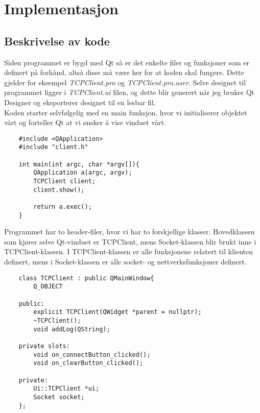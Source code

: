 \section{Implementasjon}
\subsection{Beskrivelse av kode}
Siden programmet er bygd med Qt så er det enkelte filer og funksjoner som er definert på forhånd, altså disse må være her for at koden skal fungere. Dette gjelder for eksempel \textit{TCPClient.pro} og \textit{TCPClient.pro.user}. Selve designet til programmet ligger i \textit{TCPClient.ui} filen, og dette blir generert når jeg bruker Qt Designer og eksporterer designet til en lesbar fil.\\

Koden starter selvfølgelig med en main funksjon, hvor vi initialiserer objektet vårt og forteller Qt at vi ønsker å vise vinduet vårt.
\begin{lstlisting}
	#include <QApplication>
	#include "client.h"

	int main(int argc, char *argv[]){
		QApplication a(argc, argv);
		TCPClient client;
		client.show();

		return a.exec();
	}
\end{lstlisting}

Programmet har to header-filer, hvor vi har to forskjellige klasser. Hovedklassen som kjører selve Qt-vinduet er TCPClient, mens Socket-klassen blir brukt inne i TCPClient-klassen. I TCPClient-klassen er alle funksjonene relatert til klienten definert, mens i Socket-klassen er alle socket- og nettverksfunksjoner definert.
\begin{lstlisting}
	class TCPClient : public QMainWindow{
		Q_OBJECT

	public:
		explicit TCPClient(QWidget *parent = nullptr);
		~TCPClient();
		void addLog(QString);

	private slots:
		void on_connectButton_clicked();
		void on_clearButton_clicked();

	private:
		Ui::TCPClient *ui;
		Socket socket;
	};
\end{lstlisting}

